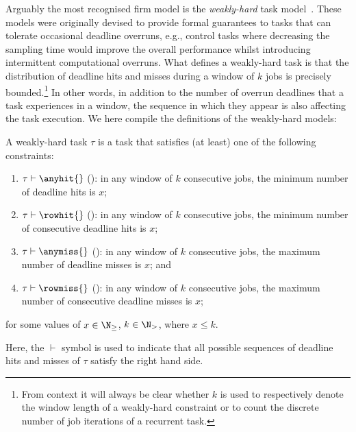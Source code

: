 Arguably the most recognised firm model is the \emph{weakly-hard} task model~\cite{Bernat:2001}.
These models were originally devised to provide formal guarantees to tasks that can tolerate occasional deadline overruns, e.g., control tasks where decreasing the sampling time would improve the overall performance whilst introducing intermittent computational overruns.
What defines a weakly-hard task is that the distribution of deadline hits and misses during a window of $k$ jobs is precisely bounded.\footnote{From context it will always be clear whether $k$ is used to respectively denote the window length of a weakly-hard constraint or to count the discrete number of job iterations of a recurrent task.}
In other words, in addition to the number of overrun deadlines that a task experiences in a window, the sequence in which they appear is also affecting the task execution.
We here compile the definitions of the weakly-hard models:
%
\begin{definition}%
\label{def:kappa:weakly-hard}%
    A weakly-hard task $\tau$ is a task that satisfies (at least) one of the following constraints:
    \begin{enumerate}[label=(\roman*)]
        \item \label{item:AnyHit} $\tau \vdash \anyhit{}$ (\tAH{}): in any window of $k$ consecutive jobs, the minimum number of deadline hits is $x$;
        \item \label{item:RowHit} $\tau \vdash \rowhit{}$ (\tRH{}): in any window of $k$ consecutive jobs, the minimum number of consecutive deadline hits is $x$;
        \item \label{item:AnyMiss} $\tau \vdash \anymiss{}$ (\tAM{}): in any window of $k$ consecutive jobs, the maximum number of deadline misses is $x$; and
        \item \label{item:RowMiss} $\tau \vdash \rowmiss{}$ (\tRM{}): in any window of $k$ consecutive jobs, the maximum number of consecutive deadline misses is $x$;
    \end{enumerate}
    for some values of $x\in \N_{\geq}$, $k \in \N_{>}$, where $x\leq k$.
\end{definition}
%
Here, the $\vdash$ symbol is used to indicate that all possible sequences of deadline hits and misses of $\tau$ satisfy the right hand side.


